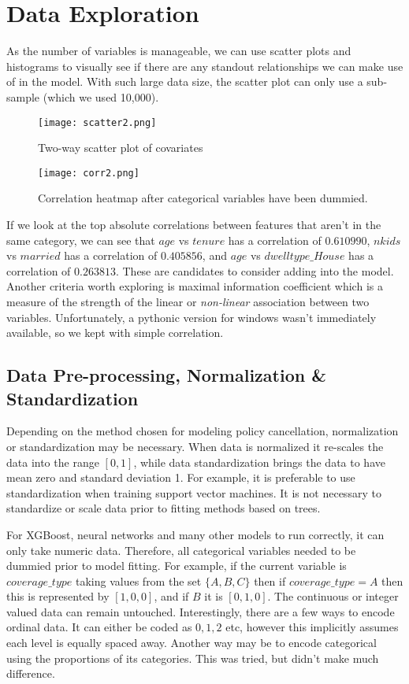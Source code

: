 \documentclass[11pt]{article}
\theoremstyle{remark}
\theoremstyle{definition}
\begin{document}
\section{Data Exploration}
As the number of variables is manageable, we can use scatter plots and histograms to visually see if there are any standout relationships we can make use of in the model. With such large data size, the scatter plot can only use a sub-sample (which we used 10,000).
\begin{figure}[H]
    \centering
    \begin{minipage}{.5\linewidth}
        \centering
        \texttt{[image: scatter2.png]}
        \caption{Two-way scatter plot of covariates}
        \label{fig:scatter}
    \end{minipage}%
    \begin{minipage}{0.5\linewidth}
        \centering
        \texttt{[image: corr2.png]}
        \caption{Correlation heatmap after categorical variables have been dummied.}
        \label{fig:corr}
    \end{minipage}
\end{figure}
If we look at the top absolute correlations between features that aren't in the same category, we can see that $age$ vs $tenure$ has a correlation of $0.610990$, $nkids$ vs $married$  has a correlation of $0.405856$, and $age$ vs $dwelltype\_House$ has a correlation of $0.263813$. These are candidates to consider adding into the model. Another criteria worth exploring is maximal information coefficient \citep{reshef2011} which is a measure of the strength of the linear or \textit{non-linear} association between two variables. Unfortunately, a pythonic version for windows wasn't immediately available, so we kept with simple correlation.
\subsection{Data Pre-processing, Normalization \& Standardization}
Depending on the method chosen for modeling policy cancellation, normalization or standardization may be necessary. When data is normalized it re-scales the data into the range $[0,1]$, while data standardization brings the data to have mean zero and standard deviation 1. For example, it is preferable to use standardization when training support vector machines. It is not necessary to standardize or scale data prior to fitting methods based on trees. 

For XGBoost, neural networks and many other models to run correctly, it can only take numeric data. Therefore, all categorical variables needed to be dummied prior to model fitting. For example, if the current variable is $coverage\_type$ taking values from the set $\{A, B, C\}$ then if $coverage\_type = A$ then this is represented by $[1,0,0]$, and if $B$ it is $[0,1,0]$. The continuous or integer valued data can remain untouched. Interestingly, there are a few ways to encode ordinal data. It can either be coded as $0,1,2$ etc, however this implicitly assumes each level is equally spaced away. Another way may be to encode categorical using the proportions of its categories. This was tried, but didn't make much difference.
\end{document}
